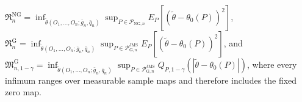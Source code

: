 \(\mathfrak R_n^{\mathrm{NG}}=\inf_{\widetilde\theta(O_1,\ldots,O_n;\bar g_n,\bar q_n)}\sup_{P\in\mathcal P_{\mathrm{NG},n}}E_P[(\widetilde\theta-\theta_0(P))^2]\), \(\mathfrak R_n^{\mathrm G}=\inf_{\widetilde\theta(O_1,\ldots,O_n;\bar g_n,\bar q_n)}\sup_{P\in\mathcal P_{\mathrm G,n}^{\mathrm{JMS}}}E_P[(\widetilde\theta-\theta_0(P))^2]\), and \(\mathfrak M_{n,1-\gamma}^{\mathrm G}=\inf_{\widetilde\theta(O_1,\ldots,O_n;\bar g_n,\bar q_n)}\sup_{P\in\mathcal P_{\mathrm G,n}^{\mathrm{JMS}}}Q_{P,1-\gamma}(|\widetilde\theta-\theta_0(P)|)\), where every infimum ranges over measurable sample maps and therefore includes the fixed zero map.